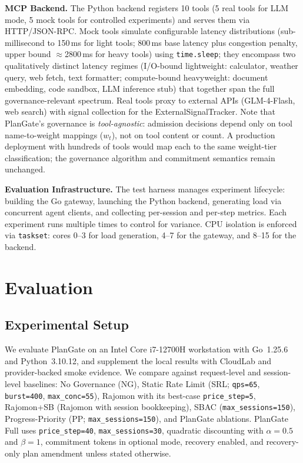 \documentclass[sigconf,review,anonymous]{acmart}
\begin{document}
\textbf{MCP Backend.} The Python backend registers 10 tools (5 real tools for LLM mode, 5 mock tools for controlled experiments) and serves them via HTTP/JSON-RPC. Mock tools simulate configurable latency distributions (sub-millisecond to 150\,ms for light tools; 800\,ms base latency plus congestion penalty, upper bound $\approx$2800\,ms for heavy tools) using \texttt{time.sleep}; they encompass two qualitatively distinct latency regimes (I/O-bound lightweight: calculator, weather query, web fetch, text formatter; compute-bound heavyweight: document embedding, code sandbox, LLM inference stub) that together span the full governance-relevant spectrum. Real tools proxy to external APIs (GLM-4-Flash, web search) with signal collection for the ExternalSignalTracker. Note that PlanGate's governance is \emph{tool-agnostic}: admission decisions depend only on tool name-to-weight mappings ($w_t$), not on tool content or count. A production deployment with hundreds of tools would map each to the same weight-tier classification; the governance algorithm and commitment semantics remain unchanged.


\textbf{Evaluation Infrastructure.} The test harness manages experiment lifecycle: building the Go gateway, launching the Python backend, generating load via concurrent agent clients, and collecting per-session and per-step metrics. Each experiment runs multiple times to control for variance. CPU isolation is enforced via \texttt{taskset}: cores 0--3 for load generation, 4--7 for the gateway, and 8--15 for the backend.



\section{Evaluation}

\subsection{Experimental Setup}

We evaluate PlanGate on an Intel Core i7-12700H workstation with Go~1.25.6 and Python~3.10.12, and supplement the local results with CloudLab and provider-backed smoke evidence. We compare against request-level and session-level baselines: No Governance (NG), Static Rate Limit (SRL; \texttt{qps=65}, \texttt{burst=400}, \texttt{max\_conc=55}), Rajomon with its best-case \texttt{price\_step=5}, Rajomon+SB (Rajomon with session bookkeeping), SBAC (\texttt{max\_sessions=150}), Progress-Priority (PP; \texttt{max\_sessions=150}), and PlanGate ablations. PlanGate Full uses \texttt{price\_step=40}, \texttt{max\_sessions=30}, quadratic discounting with $\alpha{=}0.5$ and $\beta{=}1$, commitment tokens in optional mode, recovery enabled, and recovery-only plan amendment unless stated otherwise.
\end{document}
